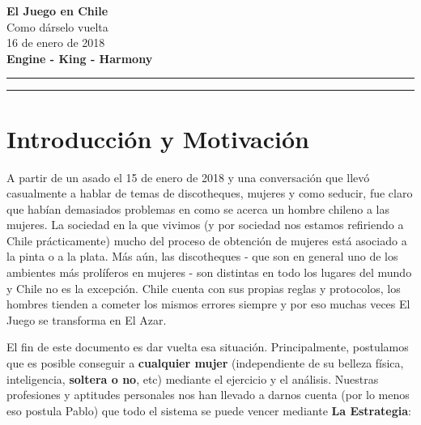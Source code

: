 \documentclass{article}
\begin{document}
\thispagestyle{empty}


\vspace*{-0.2cm}
\begin{center}
{\Large\bf El Juego en Chile}\\
\vspace*{2mm}
{\Large Como dárselo vuelta}\\
{16 de enero de 2018}\\
\vspace*{1mm}
{\bf Engine - King - Harmony}\\
\vspace*{1mm}
\end{center}
\hrule\vspace*{2pt}\hrule
\setcounter{page}{1}

\tableofcontents
\newpage
\section{Introducción y Motivación}

A partir de un asado el 15 de enero de 2018 y una conversación que llevó casualmente a hablar de temas de discotheques, mujeres y como seducir, fue claro que habían demasiados problemas en como se acerca un hombre chileno a las mujeres. La sociedad en la que vivimos (y por sociedad nos estamos refiriendo a Chile prácticamente) mucho del proceso de obtención de mujeres está asociado a la pinta o a la plata. Más aún, las discotheques - que son en general uno de los ambientes más prolíferos en mujeres - son distintas en todo los lugares del mundo y Chile no es la excepción. Chile cuenta con sus propias reglas y protocolos, los hombres tienden a cometer los mismos errores siempre y por eso muchas veces El Juego se transforma en El Azar.

El fin de este documento es dar vuelta esa situación. Principalmente, postulamos que es posible conseguir a \textbf{cualquier mujer} (independiente de su belleza física, inteligencia, \textbf{soltera o no}, etc) mediante el ejercicio y el análisis. Nuestras profesiones y aptitudes personales nos han llevado a darnos cuenta (por lo menos eso postula Pablo) que todo el sistema se puede vencer mediante \textbf{La Estrategia}:
\end{document}
